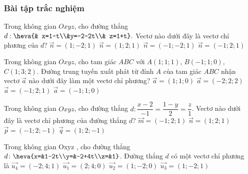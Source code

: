	\subsubsection{Bài tập trắc nghiệm}
	\begin{ex}%
	Trong không gian $Oxyz$, cho đường thẳng $d: \heva{& x=1-t\\&y=-2-2t\\& z=1+t}. $ Vectơ nào dưới đây là vectơ chỉ phương của $d$? 
	\choice
	{$\vec{n}=(1;-2;1)$}
	{$\vec{n}=(1;2;1)$}
	{\True $\vec{n}=(-1;-2;1)$}
	{$\vec{n}=(-1;2;1)$}
	\end{ex}
	\begin{ex}%
	Trong không gian $Oxyz$, cho tam giác $ABC$ với $A(1;1;1)$, $B(-1;1;0)$, $C(1;3;2)$. Đường trung tuyến xuất phát từ đỉnh $A$ của tam giác $ABC$ nhận vectơ $\overrightarrow{a}$ nào dưới đây làm một vectơ chỉ phương?
	\choice
	{$\overrightarrow{a}=(1;1;0)$}
	{$\overrightarrow{a}=(-2;2;2)$}
	{$\overrightarrow{a}=(-1;2;1)$}
	{\True $\overrightarrow{a}=(-1;1;0)$}
	\end{ex}
	\begin{ex}%
	Trong không gian $Oxyz$, cho đường thẳng $d:\dfrac{x-2}{-1}=\dfrac{1-y}{2}=\dfrac{z}{1}$. Vectơ nào dưới đây là vectơ chỉ phương của đường thẳng $d$?
	\choice
	{$\vec{m}=(-1;2;1)$}
	{$\vec{n}=(1;2;1)$}
	{$\vec{p}=(-1;2;-1)$}
	{\True $\vec{q}=(1;2;-1)$}
	\end{ex}
	\begin{ex}%
	Trong không gian Oxyz , cho đường thẳng $d\colon\heva{x=&1-2t\\y=&-2+4t\\z=&1}$. Đường thẳng $d$ có một vectơ chỉ phương là
	\choice
	{$\vec{u_4}=(-2;4;1)$}
	{$\vec{u_1}=(2;4;0)$}
	{\True $\vec{u_2}=(1;-2;0)$}
	{$\vec{u_3}=(1;-2;1)$}
	\end{ex}
